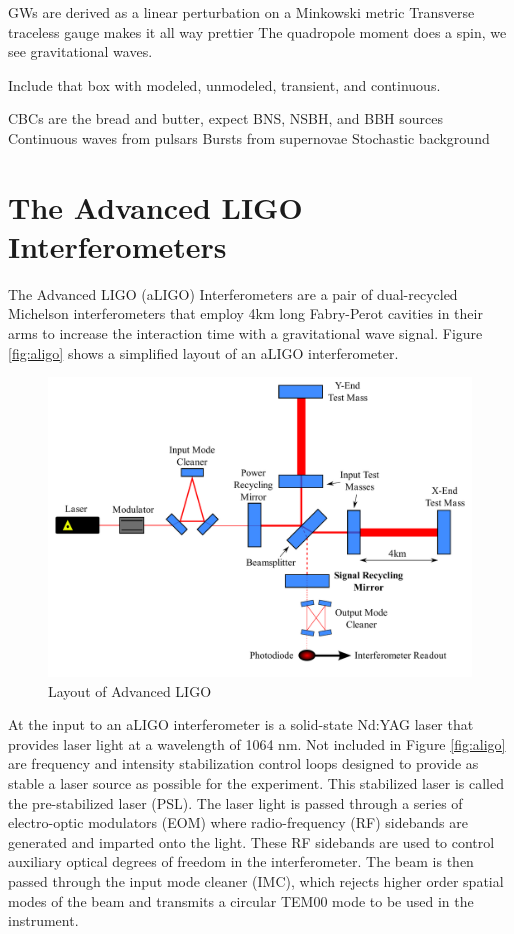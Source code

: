 GWs are derived as a linear perturbation on a Minkowski metric
Transverse traceless gauge makes it all way prettier
The quadropole moment does a spin, we see gravitational waves.

Include that box with modeled, unmodeled, transient, and continuous. 

CBCs are the bread and butter, expect BNS, NSBH, and BBH sources
Continuous waves from pulsars
Bursts from supernovae
Stochastic background

\section{The Advanced LIGO Interferometers}\label{sec:aligo}

The Advanced LIGO (aLIGO) Interferometers are a pair of dual-recycled Michelson interferometers 
that employ 4km long Fabry-Perot cavities in their arms to increase the interaction time with a 
gravitational wave signal. 
Figure \ref{fig:aligo} shows a simplified layout of an aLIGO interferometer. 

\begin{figure}[ht!]
\includegraphics[width=\textwidth]{figures/introduction/ALIGO_layout}
\caption[Layout of Advanced LIGO]{Layout of Advanced LIGO}
\end{figure}\label{fig:aligo}

At the input to an aLIGO interferometer is a solid-state Nd:YAG laser that provides laser light 
at a wavelength of 1064 nm. Not included in Figure \ref{fig:aligo} are frequency and 
intensity stabilization control loops designed to provide as stable a laser source as 
possible for the experiment. This stabilized laser is called the pre-stabilized laser 
(PSL). The laser light is passed through a series of 
electro-optic modulators (EOM) where radio-frequency (RF) sidebands are generated 
and imparted onto the light. These RF sidebands are used to control auxiliary optical 
degrees of freedom in the interferometer. The beam is then passed through the 
input mode cleaner (IMC), which rejects higher order spatial modes of the beam 
and transmits a circular TEM00 mode to be used in the instrument.

